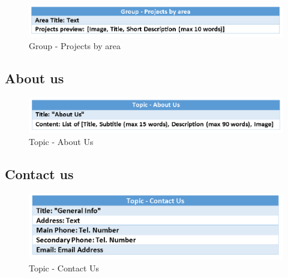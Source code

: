 \documentclass[11pt, letterpaper]{article}
\begin{document}
\begin{figure}[H]
    \centering
    \includegraphics[width=15cm]{images/Content_in_the_small/Group-Projects_by_area.png}
    \caption{Group - Projects by area}
    \label{fig:enter-label}
\end{figure}

\subsection{About us}
\begin{figure}[H]
    \centering
    \includegraphics[width=15cm]{images/Content_in_the_small/Topic-About_us.png}
    \caption{Topic - About Us}
    \label{fig:enter-label}
\end{figure}

\subsection{Contact us}
\begin{figure}[H]
    \centering
    \includegraphics[width=15cm]{images/Content_in_the_small/Topic-contact_us.png}
    \caption{Topic - Contact Us}
    \label{fig:enter-label}
\end{figure}
\end{document}
